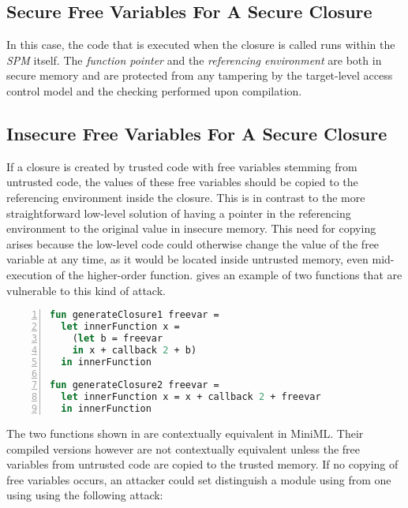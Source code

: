 \subsection{Secure Free Variables For A Secure Closure}

In this case, the code that is executed when the closure is called runs within the \emph{SPM} itself.
The \emph{function pointer} and the \emph{referencing environment} are both in secure memory and are protected from any tampering by the target-level access control model and the checking performed upon compilation.

\subsection{Insecure Free Variables For A Secure Closure}
\label{sec:insecurevaluessecureclosure}
If a closure is created by trusted code with free variables stemming from untrusted code, the values of these free variables should be copied to the referencing environment inside the closure. This is in contrast to the more straightforward low-level solution of having a pointer in the referencing environment to the original value in insecure memory.
This need for copying arises because the low-level code could otherwise change the value of the free variable at any time, as it would be located inside untrusted memory, even mid-execution of the higher-order function.
 gives an example of two functions that are vulnerable to this kind of attack.

\begin{lstlisting}[frame=single, language=ML,caption={[Copy Free Variables]Changing free variables inside untrusted memory mid-execution can break contextual equivalence.}, label=code:CopyFreeVariables,numbers=left]
fun generateClosure1 freevar =
  let innerFunction x =
    (let b = freevar
    in x + callback 2 + b)
  in innerFunction

fun generateClosure2 freevar = 
  let innerFunction x = x + callback 2 + freevar
  in innerFunction
\end{lstlisting}

The two functions shown in  are contextually equivalent in \mbox{MiniML}.
Their compiled versions however are not contextually equivalent unless the free variables from untrusted code are copied to the trusted memory.
If no copying of free variables occurs, an attacker could set distinguish a module using  from one using  using the following attack:



